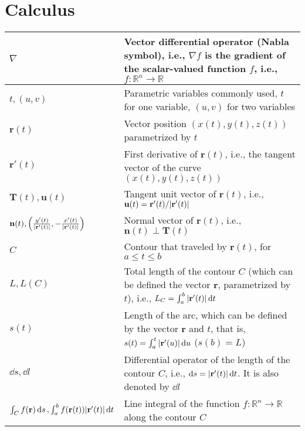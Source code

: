 \documentclass{article}
\begin{document}
\section{Calculus}
\begin{xltabular}{\textwidth}{XX}
    \(\nabla\) & Vector differential operator (Nabla symbol), i.e., \(\nabla f\) is the gradient of the scalar-valued function \(f\), i.e., \(f: \mathbb{R}^n \rightarrow \mathbb{R}\) \\ \hline
    \(t, (u,v)\) & Parametric variables commonly used, \(t\) for one variable, \((u,v)\) for two variables\cite{stewartCalculus2011}\\ \hline
    \(\mathbf{r}(t)\) & Vector position \((x(t), y(t), z(t))\) parametrized by \(t\)\cite{stewartCalculus2011}\\ \hline
    \(\mathbf{r}'(t)\) & First derivative of \(\mathbf{r}(t)\), i.e., the tangent vector of the curve \((x(t), y(t), z(t))\) \cite{stewartCalculus2011}\\ \hline
    \(\mathbf{T}(t), \mathbf{u}(t)\) & Tangent unit vector of \(\mathbf{r}(t)\), i.e., \newline  \(\mathbf{u}(t) = \mathbf{r}'(t)/\abs{\mathbf{r}'(t)}\)\cite{stewartCalculus2011,kreyszigAdvancedEngineeringMathematics2008}\\ \hline
    \(\mathbf{n}(t), \left( \frac{y'(t)}{\abs{\mathbf{r}'(t)}}, -\frac{x'(t)}{\abs{\mathbf{r}'(t)}} \right)\) & Normal vector of \(\mathbf{r}(t)\), i.e., \newline \(\mathbf{n}(t)\perp \mathbf{T}(t) \)\cite{stewartCalculus2011}\\ \hline
    \(C\)& Contour that traveled by \(\mathbf{r}(t)\), for \(a \leq t \leq b\) \cite{stewartCalculus2011}\\ \hline
    \(L, L(C)\) & Total length of the contour \(C\) (which can be defined the vector \(\mathbf{r}\), parametrized by \(t\)), i.e., \(L_C = \int_a^b \abs{\mathbf{r}'(t)} \dd{t}\)\cite{stewartCalculus2011}\\ \hline
    \(s(t)\) & Length of the arc, which can be defined by the vector \(\mathbf{r}\) and \(t\), that is, \(s(t) = \int_a^t \abs{\mathbf{r}'(u)} \dd{u}\) (\(s(b) = L\))\cite{stewartCalculus2011}\\ \hline
    \(\dd{s}, \dd{l}\) & Differential operator of the length of the contour \(C\), i.e., \(\dd{s} = \abs{\mathbf{r}'(t)} \dd{t}\). It is also denoted by \(\dd{l}\) \cite{ramoFieldsWavesCommunication1994} \\ \hline
    \(\int_C f(\mathbf{r}) \dd{s}, \int_a^b f(\mathbf{r}(t)) \abs{\mathbf{r}'(t)} \dd{t}\) & Line integral of the function \(f: \mathbb{R}^{n} \rightarrow \mathbb{R}\) along the contour \(C\) \cite{apostolCalculus2ndEdn1967,stewartCalculus2011} \\ \hline

\end{xltabular}
\end{document}
